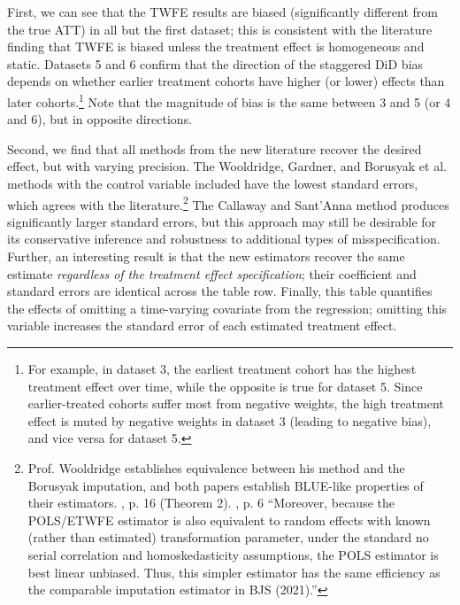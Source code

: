 \documentclass[12pt]{article}
\begin{document}
First, we can see that the TWFE results are biased (significantly different from the true ATT) in all but the first dataset; this is consistent with the literature finding that TWFE is biased unless the treatment effect is homogeneous and static. Datasets 5 and 6 confirm that the direction of the staggered DiD bias depends on whether earlier treatment cohorts have higher (or lower) effects than later cohorts.\footnote{For example, in dataset 3, the earliest treatment cohort has the highest treatment effect over time, while the opposite is true for dataset 5. Since earlier-treated cohorts suffer most from negative weights, the high treatment effect is muted by negative weights in dataset 3 (leading to negative bias), and vice versa for dataset 5.}  Note that the magnitude of bias is the same between 3 and 5 (or 4 and 6), but in opposite directions.

Second, we find that all methods from the new literature recover the desired effect, but with varying precision. The Wooldridge, Gardner, and Borusyak et al. methods with the control variable included have the lowest standard errors, which agrees with the literature.\footnote{Prof. Wooldridge establishes equivalence between his method and the Borusyak imputation, and both papers establish BLUE-like properties of their estimators. \citet{borusyak2024revisiting}, p. 16 (Theorem 2). \citet{wooldridge2021two}, p. 6 “Moreover, because the POLS/ETWFE estimator is also equivalent to random effects with known (rather than estimated) transformation parameter, under the standard no serial correlation and homoskedasticity assumptions, the POLS estimator is best linear unbiased. Thus, this simpler estimator has the same efficiency as the comparable imputation estimator in BJS (2021).”}  The Callaway and Sant’Anna method produces significantly larger standard errors, but this approach may still be desirable for its conservative inference and robustness to additional types of misspecification. Further, an interesting result is that the new estimators recover the same estimate \textit{regardless of the treatment effect specification}; their coefficient and standard errors are identical across the table row. Finally, this table quantifies the effects of omitting a time-varying covariate from the regression; omitting this variable increases the standard error of each estimated treatment effect.
\end{document}
